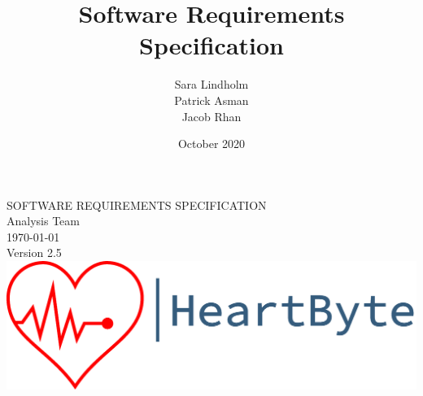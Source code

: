 \documentclass{scrreprt}
\title{Software Requirements Specification}
\author{Sara Lindholm \\ Patrick Asman \\ Jacob Rhan}
\date{October 2020}
\def\myversion{2.5}
\begin{document}
\begin{titlepage}
    \begin{center}
    \begin{bfseries}
        \Huge{SOFTWARE REQUIREMENTS SPECIFICATION}\\
        \vspace{1.5cm}
        \LARGE Analysis Team \\
        \vspace{1.5cm}
        \today\\
        \vspace{1.5cm}
        {Version \myversion}\\
        \vfill
        \includegraphics[width=\linewidth]{Pictures/logo.png} \\
    \end{bfseries}
    \end{center}
\end{titlepage}
\end{document}
